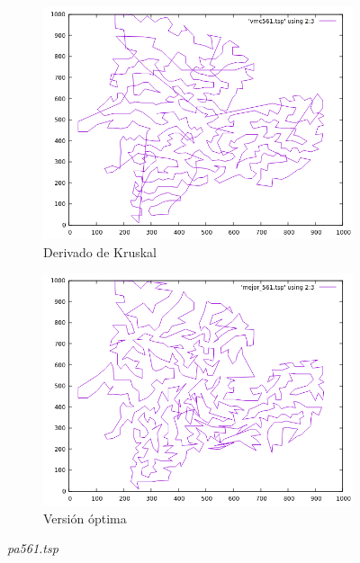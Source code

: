 \documentclass[12pt,spanish]{article}
\begin{document}
\begin{figure}[H]
\begin{subfigure}[b]{0.36\textwidth}
\includegraphics[width=\textwidth]{pa561_vmc.png}
\caption{Derivado de Kruskal}
\end{subfigure}
\quad
\begin{subfigure}[b]{0.36\textwidth}
\includegraphics[width=\textwidth]{pa561_mejor.png}
\caption{Versión óptima}
\end{subfigure}
\caption{\textit{pa561.tsp}}
\end{figure}
\end{document}
